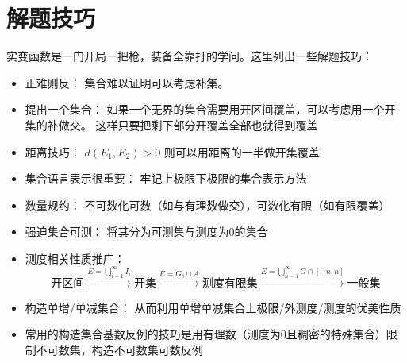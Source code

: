 \section{解题技巧}
实变函数是一门开局一把枪，装备全靠打的学问。这里列出一些解题技巧：
\begin{itemize}
    \item 正难则反： 集合难以证明可以考虑补集。
    \item 提出一个集合： 如果一个无界的集合需要用开区间覆盖，可以考虑用一个开集的补做交。
        这样只要把剩下部分开覆盖全部也就得到覆盖
    \item 距离技巧： \(d(E_{1},E_{2})>0\) 则可以用距离的一半做开集覆盖
    \item 集合语言表示很重要： 牢记上极限下极限的集合表示方法
    \item 数量规约： 不可数化可数（如与有理数做交），可数化有限（如有限覆盖）
    \item 强迫集合可测： 将其分为可测集与测度为0的集合
    \item 测度相关性质推广： \[
            \text{开区间}
            \xrightarrow{E=\bigcup_{i=1}^{\infty} I_{i}}
            \text{开集} \xrightarrow{E=G_{\delta} \cup A}
            \text{测度有限集}
            \xrightarrow{E=\bigcup_{n=1}^{\infty} G\cap
            [-n,n]} \text{一般集}
        \]
    \item 构造单增/单减集合： 从而利用单增单减集合上极限/外测度/测度的优美性质
    \item 常用的构造集合基数反例的技巧是用有理数（测度为0且稠密的特殊集合）限制不可数集，构造不可数集可数反例
\end{itemize}

